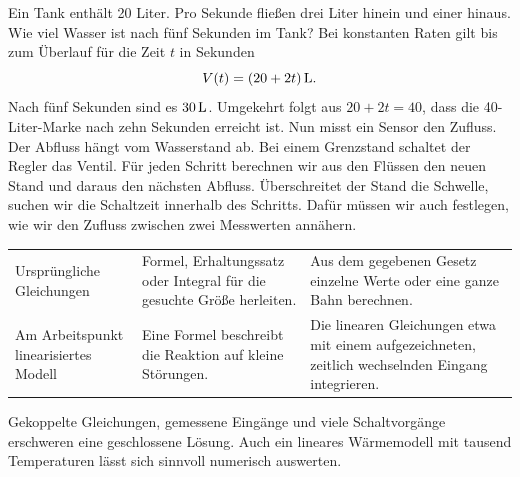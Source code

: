 Ein Tank enthält 20 Liter. Pro Sekunde fließen drei Liter hinein und einer hinaus. Wie viel Wasser ist nach fünf Sekunden im Tank? Bei konstanten Raten gilt bis zum Überlauf für die Zeit \(t\) in Sekunden
\[
 V(t)=(20+2t)\,\mathrm{L} .
\]
Nach fünf Sekunden sind es \(30\,\mathrm{L}\). Umgekehrt folgt aus \(20+2t=40\), dass die 40-Liter-Marke nach zehn Sekunden erreicht ist.
Nun misst ein Sensor den Zufluss. Der Abfluss hängt vom Wasserstand ab. Bei einem Grenzstand schaltet der Regler das Ventil. Für jeden Schritt berechnen wir aus den Flüssen den neuen Stand und daraus den nächsten Abfluss. Überschreitet der Stand die Schwelle, suchen wir die Schaltzeit innerhalb des Schritts. Dafür müssen wir auch festlegen, wie wir den Zufluss zwischen zwei Messwerten annähern.
{\tblstart\begin{tabularx}{\linewidth}{@{}P{30mm}YY@{}}\toprule
{}&&\\\midrule
Ursprüngliche Gleichungen&Formel, Erhaltungssatz oder Integral für die gesuchte Größe herleiten.&Aus dem gegebenen Gesetz einzelne Werte oder eine ganze Bahn berechnen.\\
Am Arbeitspunkt linearisiertes Modell&Eine Formel beschreibt die Reaktion auf kleine Störungen.&Die linearen Gleichungen etwa mit einem aufgezeichneten, zeitlich wechselnden Eingang integrieren.\\\bottomrule\end{tabularx}\par}
Gekoppelte Gleichungen, gemessene Eingänge und viele Schaltvorgänge erschweren eine geschlossene Lösung. Auch ein lineares Wärmemodell mit tausend Temperaturen lässt sich sinnvoll numerisch auswerten.

